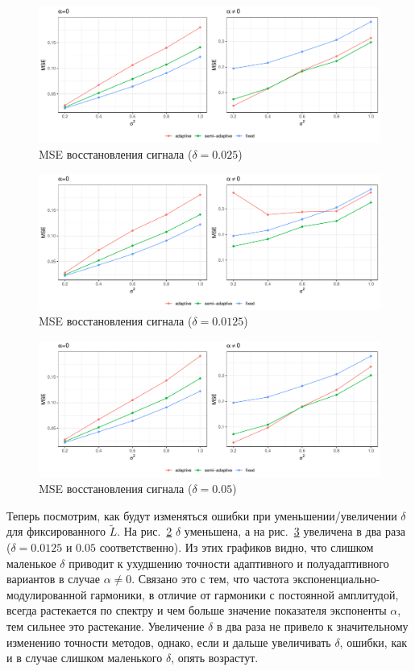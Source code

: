 \documentclass{math-mech-sci}
\begin{document}
\begin{figure}[h!]
    \centering
    \includegraphics[width=\linewidth]{img/mse.pdf}
    \caption{MSE восстановления сигнала ($\delta=0.025$)}
    \label{fig:mse1}
\end{figure}
\begin{figure}[h!]
    \centering
    \includegraphics[width=\linewidth]{img/mse_delta_smaller.pdf}
    \caption{MSE восстановления сигнала ($\delta=0.0125$)}
    \label{fig:mse2}
\end{figure}
\begin{figure}[h!]
    \centering
    \includegraphics[width=\linewidth]{img/mse_delta_bigger.pdf}
    \caption{MSE восстановления сигнала ($\delta=0.05$)}
    \label{fig:mse3}
\end{figure}

Теперь посмотрим, как будут изменяться ошибки при уменьшении/увеличении $\delta$ для фиксированного $\widetilde L$. На рис.~\ref{fig:mse2} $\delta$ уменьшена, а на рис.~\ref{fig:mse3} увеличена в два раза ($\delta=0.0125$ и $0.05$ соответственно). Из этих графиков видно, что слишком маленькое $\delta$ приводит к ухудшению точности адаптивного и полуадаптивного вариантов в случае $\alpha\ne0$. Связано это с тем, что частота экспоненциально-модулированной гармоники, в отличие от гармоники с постоянной амплитудой, всегда растекается по спектру и чем больше значение показателя экспоненты $\alpha$, тем сильнее это растекание. Увеличение $\delta$ в два раза не привело к значительному изменению точности методов, однако, если и дальше увеличивать $\delta$, ошибки, как и в случае слишком маленького $\delta$, опять возрастут.
\end{document}
